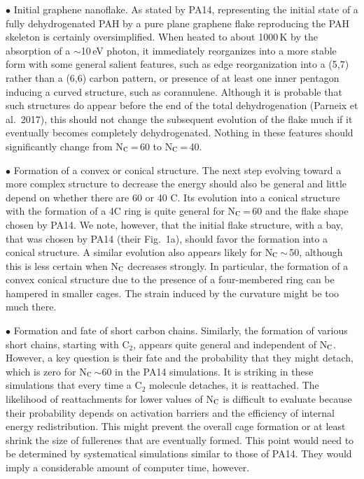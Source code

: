 \documentclass{aa}
\begin{document}
$\bullet$ Initial graphene nanoflake.
As stated by PA14, representing the initial state of a fully dehydrogenated PAH by a pure plane graphene flake reproducing the PAH skeleton is certainly oversimplified. When heated to about 1000\,K by the absorption of 
a $\sim$10\,eV photon, it immediately reorganizes into a more stable form 
 with some general salient features, such as  
 edge  reorganization into a (5,7) rather than a (6,6) carbon pattern, or presence of at least one inner pentagon inducing a curved structure, such as corannulene. Although it is probable that  such structures do appear 
before the end of the total dehydrogenation (Parneix et al.\ 2017), this should not change the subsequent evolution of the flake much if it eventually becomes completely dehydrogenated. Nothing in these features should significantly change from N$_{\rm C}$\,=\,60 to N$_{\rm C}$\,=\,40.


$\bullet$ Formation of a convex or conical structure. The next step evolving 
toward a more complex structure to decrease the energy should also be general and little depend on whether there are 60 or 40 C. Its evolution  into a conical structure  with the formation of a 4C ring is  quite general  for N$_{\rm C}$\,=\,60  and the flake shape chosen by PA14.
We note, however, that the initial flake structure, with a bay, that was chosen by PA14 (their Fig.\ 1a), should favor the formation into a conical structure.
A similar evolution also appears likely for  N$_{\rm C}$\,$\sim$\,50, although this is less certain when N$_{\rm C}$ decreases strongly. In particular, the formation of a convex conical structure due to the presence of a four-membered ring can be hampered in smaller cages. The strain induced by the curvature might be too much there.

$\bullet$  Formation and fate of short carbon chains. 
Similarly,  the formation of various short chains, starting with C$_2$, appears quite general and independent of N$_{\rm C}$. However, a key question is their fate and the probability that they might detach, which is zero  for N$_{\rm C}$\,$\sim$60 in the PA14 simulations. It is striking in these simulations that every time a C$_2$ molecule detaches, it is reattached. The likelihood of reattachments for lower values of N$_{\rm C}$ is difficult to evaluate because their probability  depends on activation barriers and the efficiency of internal energy redistribution.  This might 
prevent the overall cage formation or at least shrink the size of fullerenes that are eventually formed. 
This point would need to be determined by systematical simulations similar to those of PA14. They would imply a considerable amount of computer time, however. 
\end{document}
